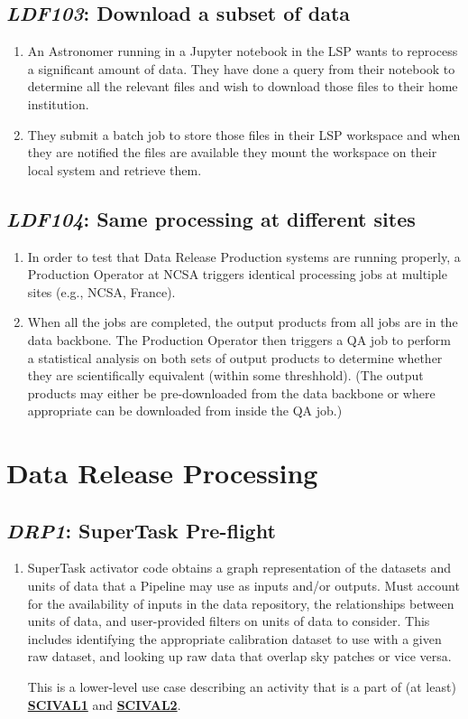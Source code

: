 \documentclass[DM,toc,lsstdraft]{lsstdoc}
\newcommand{\usecase}[3]{%
\subsection{\emph{#1}: #2}
\label{use:#1}
\begin{enumerate}[label=\alph*.]
#3
\end{enumerate}
}
\newcommand{\useref}[1]{\hyperref[use:#1]{\textcolor{lsstblue}{\textbf{#1}}}}
\begin{document}
\usecase{LDF103}{Download a subset of data}{%

\item
An Astronomer running in a Jupyter notebook in the LSP wants to reprocess a significant amount of data.
They have done a query from their notebook to determine all the relevant files and wish to download those files to their home institution.

\item
They submit a batch job to store those files in their LSP workspace and when they are notified the files are available they mount the workspace on their local system and retrieve them.

}

\usecase{LDF104}{Same processing at different sites}{%

\item
In order to test that Data Release Production systems are running properly, a Production Operator at NCSA triggers identical processing jobs at multiple sites (e.g., NCSA, France).

\item
When all the jobs are completed, the output products from all jobs are in the data backbone.
The Production Operator then triggers a QA job to perform a statistical analysis on both sets of output products to determine whether they are scientifically equivalent (within some threshhold).
(The output products may either be pre-downloaded from the data backbone or where appropriate can be downloaded from inside the QA job.)

}

\section{Data Release Processing}

\usecase{DRP1}{SuperTask Pre-flight}{%

\item
SuperTask activator code obtains a graph representation of the datasets and units of data that a Pipeline may use as inputs and/or outputs.
Must account for the availability of inputs in the data repository, the relationships between units of data, and user-provided filters on units of data to consider.
This includes identifying the appropriate calibration dataset to use with a given raw dataset, and looking up raw data that overlap sky patches or vice versa.

This is a lower-level use case describing an activity that is a part of (at least) \useref{SCIVAL1} and \useref{SCIVAL2}.

}
\end{document}
